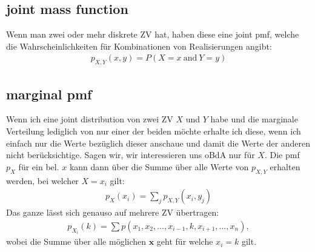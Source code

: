 \documentclass[paper=a4,10pt]{scrartcl}
\begin{document}
\subsection{joint mass function}
Wenn man zwei oder mehr diskrete ZV hat, haben diese eine joint pmf, welche die Wahrscheinlichkeiten für Kombinationen von Realisierungen angibt:
\begin{align}
p_{X,Y}(x,y) = P(X=x \: \text{and} \: Y=y)
\end{align}

\subsection{marginal pmf}
Wenn ich eine joint distribution von zwei ZV $X$ und $Y$ habe und die marginale Verteilung lediglich von nur einer der beiden möchte erhalte ich diese, wenn ich einfach nur die Werte bezüglich dieser anschaue und damit die Werte der anderen nicht berücksichtige. Sagen wir, wir interessieren uns oBdA nur für $X$. Die pmf $p_X$ für ein bel. $x$ kann dann über die Summe über alle Werte von $p_{X,Y}$ erhalten werden, bei welcher $X=x_i$ gilt:
\begin{align}
p_X(x_i) = \sum_j p_{X,Y}(x_i, y_j)
\end{align}
Das ganze lässt sich genauso auf mehrere ZV übertragen:
\begin{align}
p_{X_i}(k) = \sum p(x_1, x_2, \dots, x_{i-1}, k, x_{i+1}, \dots, x_n),
\end{align}
wobei die Summe über alle möglichen $\bm x$ geht für welche $x_i = k$ gilt.
\end{document}
